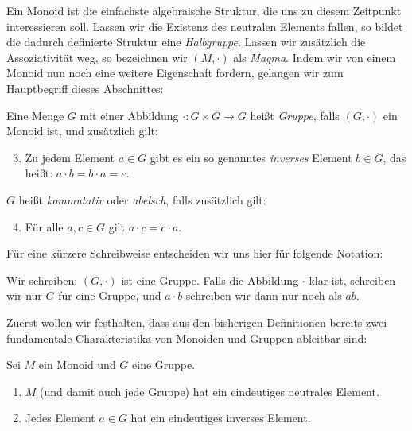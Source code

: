 {Ein Monoid ist die einfachste algebraische Struktur, die uns zu diesem Zeitpunkt interessieren soll. Lassen wir die Existenz des neutralen Elements fallen, so bildet die dadurch definierte Struktur eine \emph{Halbgruppe}. Lassen wir zusätzlich die Assoziativität weg, so bezeichnen wir $(M,\cdot)$ als \emph{Magma}. Indem wir von einem Monoid nun noch eine weitere Eigenschaft fordern, gelangen wir zum Hauptbegriff dieses Abschnittes:

\begin{definition}[Gruppe]
  Eine Menge $G$ mit einer Abbildung $\cdot \colon G \times G \rightarrow G$ heißt \emph{Gruppe}, falls $(G,\cdot)$ ein Monoid ist, und zusätzlich gilt:
  \begin{enumerate}\setcounter{enumi}{2}
    \item Zu jedem Element $a \in G$ gibt es ein so genanntes \emph{inverses} Element $b \in G$, das heißt: $a \cdot b = b \cdot a = e$.
  \end{enumerate}
  $G$ heißt \emph{kommutativ} oder \emph{abelsch}, falls zusätzlich gilt:
  \begin{enumerate}\setcounter{enumi}{3}
    \item Für alle $a,c \in G$ gilt $a \cdot c = c \cdot a$.
  \end{enumerate}
\end{definition}

Für eine kürzere Schreibweise entscheiden wir uns hier für folgende Notation:

\begin{notation}
  Wir schreiben: $(G,\cdot)$ ist eine Gruppe. Falls die Abbildung $\cdot$ klar ist, schreiben wir nur $G$ für eine Gruppe, und $a \cdot b$ schreiben wir dann nur noch als $ab$.
\end{notation}

Zuerst wollen wir festhalten, dass aus den bisherigen Definitionen bereits zwei fundamentale Charakteristika von Monoiden und Gruppen ableitbar sind:

\begin{proposition}
  Sei $M$ ein Monoid und $G$ eine Gruppe.
  \begin{enumerate}
    \item $M$ (und damit auch jede Gruppe) hat ein eindeutiges neutrales Element.
    \item Jedes Element $a \in G$ hat ein eindeutiges inverses Element.
  \end{enumerate}
\end{proposition}

}
